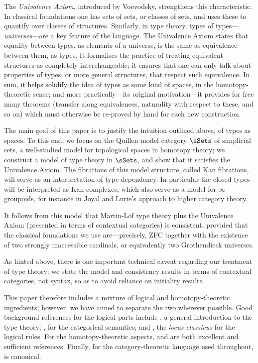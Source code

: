 The \emph{Univalence Axiom}, introduced by Voevodsky, strengthens this characteristic.  In classical foundations one has sets of sets, or classes of sets, and uses these to quantify over classes of structures.  Similarly, in type theory, types of types—\emph{universes}—are a key feature of the language.  The Univalence Axiom states that equality between types, as elements of a universe, is the same as equivalence between them, as types.  It formalises the practice of treating equivalent structures as completely interchangeable; it ensures that one can only talk about properties of types, or more general structures, that respect such equivalence.  In sum, it helps solidify the idea of types as some kind of spaces, in the homotopy-theoretic sense; and more practically—its original motivation—it provides for free many theorems (transfer along equivalences, naturality with respect to these, and so on) which must otherwise be re-proved by hand for each new construction.

The main goal of this paper is to justify the intuition outlined above, of types as spaces.
%
To this end, we focus on the Quillen model category $\sSets$ of simplicial sets, a well-studied model for topological spaces in homotopy theory; we construct a model of type theory in $\sSets$, and show that it satisfies the Univalence Axiom.
%
The fibrations of this model structure, called Kan fibrations, will serve as an interpretation of type dependency.
% 
In particular the closed types will be interpreted as Kan complexes, which also serve as a model for $\infty$-groupoids, for instance in Joyal and Lurie's approach to higher category theory.

It follows from this model that Martin-Löf type theory plus the Univalence Axiom (presented in terms of contextual categories) is consistent, provided that the classical foundations we use are---precisely, ZFC together with the existence of two strongly inaccessible cardinals, or equivalently two Grothendieck universes.

As hinted above, there is one important technical caveat regarding our treatment of type theory: we state the model and consistency results in terms of contextual categories, not syntax, so as to avoid reliance on initiality results.

This paper therefore includes a mixture of logical and homotopy-theoretic ingredients; however, we have aimed to separate the two wherever possible.  Good background references for the logical parts include \cite{n-p-s:programming}, a general introduction to the type theory; \cite{hofmann:syntax-and-semantics}, for the categorical semantics; and \cite{martin-lof:bibliopolis}, the \emph{locus classicus} for the logical rules.  For the homotopy-theoretic aspects, \cite{goerss-jardine} and \cite{hovey:book} are both excellent and sufficient references.  Finally, for the category-theoretic language used throughout, \cite{mac-lane:cwm} is canonical.


